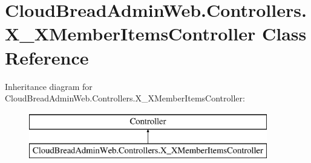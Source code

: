 \hypertarget{class_cloud_bread_admin_web_1_1_controllers_1_1_x___x_member_items_controller}{}\section{Cloud\+Bread\+Admin\+Web.\+Controllers.\+X\+\_\+\+X\+Member\+Items\+Controller Class Reference}
\label{class_cloud_bread_admin_web_1_1_controllers_1_1_x___x_member_items_controller}
Inheritance diagram for Cloud\+Bread\+Admin\+Web.\+Controllers.\+X\+\_\+\+X\+Member\+Items\+Controller\+:\begin{figure}[H]
\begin{center}
\leavevmode
\includegraphics[height=2.000000cm]{class_cloud_bread_admin_web_1_1_controllers_1_1_x___x_member_items_controller}
\end{center}
\end{figure}
